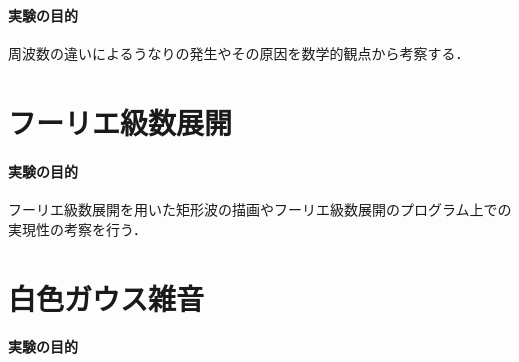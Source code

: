 \section{\kadaiac}
\paragraph{実験の目的}周波数の違いによるうなりの発生やその原因を数学的観点から考察する．
\section{フーリエ級数展開}
\paragraph{実験の目的}フーリエ級数展開を用いた矩形波の描画やフーリエ級数展開のプログラム上での実現性の考察を行う．
\section{白色ガウス雑音}
\paragraph{実験の目的}